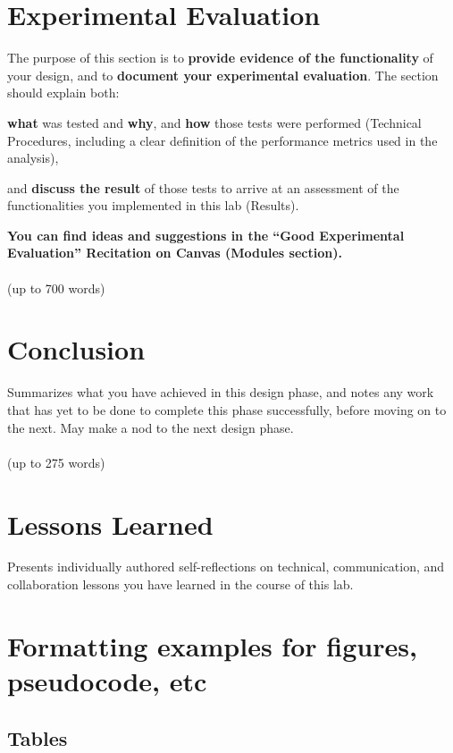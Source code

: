 \documentclass{article}
\begin{document}
\section{Experimental Evaluation}
The purpose of this section is to \textbf{provide evidence of the functionality} of your design, and to \textbf{document your experimental evaluation}. The section should explain both:

\begin{enumerate}
\begin{item}
\textbf{what} was tested and \textbf{why}, and \textbf{how} those tests were performed (Technical Procedures, including a clear definition of the performance metrics used in the analysis),
\end{item}
\begin{item}
and \textbf{discuss the result} of those tests to arrive at an assessment of the functionalities you implemented in this lab (Results).
\end{item}
\end{enumerate}

\textbf{You can find ideas and suggestions in the “Good Experimental Evaluation” Recitation on Canvas (Modules section).}\\\\
(up to 700 words)

\section{Conclusion}
Summarizes what you have achieved in this design phase, and notes any work that has yet to be done to complete this phase successfully, before moving on to the next. May make a nod to the next design phase.\\\\
(up to 275 words)

\section{Lessons Learned}
Presents individually authored self-reflections on technical, communication, and collaboration lessons you have learned in the course of this lab.

\section{Formatting examples for figures, pseudocode, etc}

\subsection{Tables}
\end{document}
